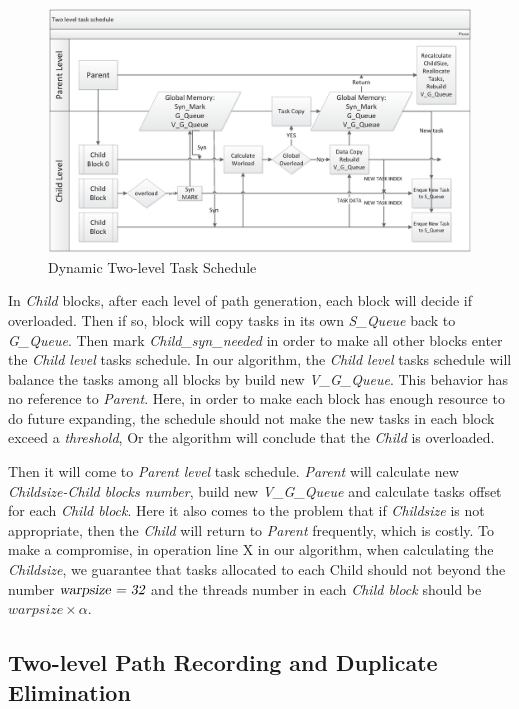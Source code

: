 \documentclass{llncs}
\begin{document}
\begin{figure}[htbp]
    \includegraphics[width=\textwidth]{TwoTS.eps}
    \caption{Dynamic Two-level Task Schedule}
    \label{fig:TwoTS}
\end{figure}

In \textsl{Child} blocks, after each level of path generation, each block will decide if overloaded. Then if so, block will copy tasks in its own \textsl{S\_Queue} back to \textsl{G\_Queue}. Then mark \textsl{Child\_syn\_needed} in order to make all other blocks enter the \textsl{Child level} tasks schedule. In our algorithm, the \textsl{Child level} tasks schedule will balance the tasks among all blocks by build new \textsl{V\_G\_Queue}. This behavior has no reference to \textsl{Parent}. Here, in order to make each block has enough resource to do future expanding, the schedule should not make the new tasks in each block exceed a \textsl{threshold}, Or the algorithm will conclude that the \textsl{Child} is overloaded.

Then it will come to \textsl{Parent level} task schedule. \textsl{Parent} will calculate new \textsl{Childsize-Child blocks number}, build new \textsl{V\_G\_Queue} and calculate tasks offset for each \textsl{Child block}. Here it also comes to the problem that if \textsl{Childsize} is not appropriate, then the \textsl{Child} will return to \textsl{Parent} frequently, which is costly. To make a compromise, in operation line X in our algorithm, when calculating the \textsl{Childsize}, we guarantee that tasks allocated to each Child should not beyond the number $\textsl{warpsize = 32}$ and the threads number in each \textsl{Child block} should be $warpsize\times\alpha$.

%
\subsection{Two-level Path Recording and Duplicate Elimination}
%
\end{document}

